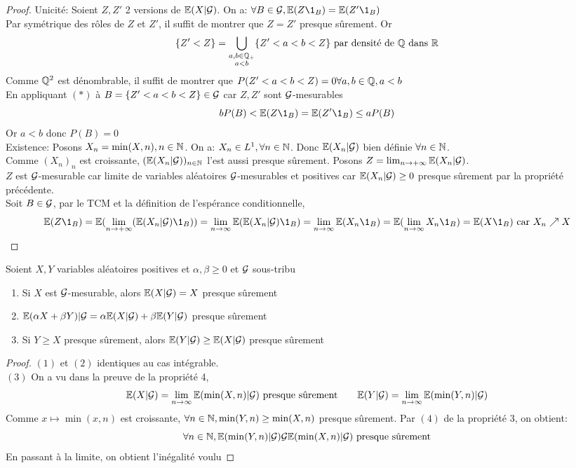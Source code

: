 \documentclass[]{report}
\begin{document}
    \begin{proof}
        Unicité: Soient $Z,Z'$ 2 versions de $\mathbb{E}(X|\mathcal{G})$. On a: $\forall B\in \Gr,\Ea(Z\1_B)=\Ea(Z'\1_B)$\\
        Par symétrique des rôles de $Z$ et $Z'$, il suffit de montrer que $Z=Z'$ presque sûrement. Or 
        \[\{Z'<Z\}=\bigcup_{\substack{a,b\in \mathbb{Q}_+\\ a<b}}\{Z'<a<b<Z\}\text{ par densité de $\mathbb{Q}$ dans $\mathbb{R}$}\]
        Comme $\mathbb{Q}^2$ est dénombrable, il suffit de montrer que $P(Z'<a<b<Z)=0\forall a,b\in\mathbb{Q},a<b$\\
        En appliquant $(*)$ à $B=\{Z'<a<b<Z\}\in \mathcal{G}$ car $Z,Z'$ sont $\mathcal{G}$-mesurables
        \[bP(B)<\Ea(Z\1_B)=\Ea(Z'\1_B)\le a P(B)\]
        Or $a<b$ donc $P(B)=0$\\
        Existence: Posons $X_n=\min(X,n),n\in \mathbb{N}$. On a: $X_n\in L^1,\forall n\in \mathbb{N}$. Donc $\mathbb{E}(X_n|\mathcal{G})$ bien définie $\forall n\in \mathbb{N}$.\\
        Comme $(X_n)_n$ est croissante, $(\mathbb{E}(X_n|\mathcal{G}))_{n\in\mathbb{N}}$ l'est aussi presque sûrement. Posons $Z=\lim_{n\to+\infty}\mathbb{E}(X_n|\mathcal{G})$.\\
        $Z$ est $\mathcal{G}$-mesurable car limite de variables aléatoires $\mathcal{G}$-mesurables et positives car $\mathbb{E}(X_n|\mathcal{G})\ge 0$ presque sûrement par la propriété précédente.\\
        Soit $B\in \mathcal{G}$, par le TCM et la définition de l'espérance conditionnelle,
        \[\Ea(Z\1_B)=\Ea(\lim_{n\to +\infty}(\Ea(X_n|\Gr)\1_B))=\lim_{n\to \infty} \Ea(\Ea(X_n|\Gr)\1_B)=\lim_{n\to \infty}\Ea(X_n \1_B)=\Ea(\lim_{n\to \infty}X_n \1_B)=\Ea(X\1_B)\text{ car $X_n\nearrow X$}\]
    \end{proof}

    \begin{prop}{}{}
        Soient $X,Y$ variables aléatoires positives et $\alpha,\beta \ge 0$ et $\mathcal{G}$ sous-tribu
        \begin{enumerate}
            \item Si $X$ est $\mathcal{G}$-mesurable, alors $\mathbb{E}(X|\mathcal{G})=X$ presque sûrement
            \item $\mathbb{E}(\alpha X+\beta Y)|\mathcal{G}=\alpha \mathbb{E}(X|\mathcal{G})+\beta \mathbb{E}(Y|\mathcal{G})$ presque sûrement
            \item Si $Y\ge X$ presque sûrement, alors $\mathbb{E}(Y|\mathcal{G})\ge \mathbb{E}(X|\mathcal{G})$ presque sûrement
        \end{enumerate}
    \end{prop}

    \begin{proof}
        $(1)$ et $(2)$ identiques au cas intégrable.\\
        $(3)$ On a vu dans la preuve de la propriété 4,
        \[\mathbb{E}(X|\mathcal{G})=\lim_{n\to \infty}\mathbb{E}(\min(X,n)|\mathcal{G})\text{ presque sûrement}\qquad \mathbb{E}(Y|\mathcal{G})=\lim_{n\to \infty}\mathbb{E}(\min(Y,n)|\mathcal{G})\]
        Comme $x\mapsto \min(x,n)$ est croissante, $\forall n\in \mathbb{N}, \min(Y,n)\ge \min (X,n)$ presque sûrement. Par $(4)$ de la propriété 3, on obtient:
        \[\forall n\in \mathbb{N}, \mathbb{E}(\min(Y,n)|\mathcal{G})\mathcal{G} \mathbb{E}(\min(X,n)|\mathcal{G})\text{ presque sûrement}\]
        En passant à la limite, on obtient l'inégalité voulu
    \end{proof}
\end{document}
